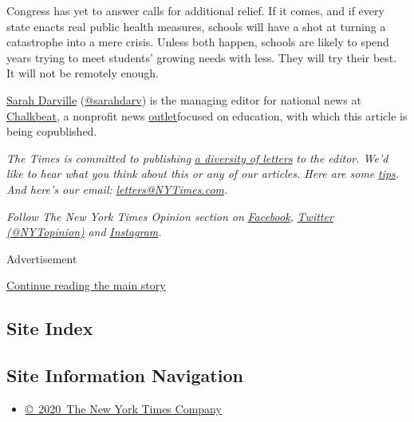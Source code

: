Congress has yet to answer calls for additional relief. If it comes, and
if every state enacts real public health measures, schools will have a
shot at turning a catastrophe into a mere crisis. Unless both happen,
schools are likely to spend years trying to meet students' growing needs
with less. They will try their best. It will not be remotely enough.

\href{https://www.chalkbeat.org/authors/sarah-darville}{Sarah Darville}
(\href{https://twitter.com/sarahdarv?lang=en}{@sarahdarv}) is the
managing editor for national news at
\href{https://www.chalkbeat.org/}{Chalkbeat}, a nonprofit news
\href{https://www.chalkbeat.org/pages/newsletters}{outlet}focused on
education, with which this article is being copublished.

\emph{The Times is committed to publishing}
\href{https://www.nytimes3xbfgragh.onion/2019/01/31/opinion/letters/letters-to-editor-new-york-times-women.html}{\emph{a
diversity of letters}} \emph{to the editor. We'd like to hear what you
think about this or any of our articles. Here are some}
\href{https://help.nytimes3xbfgragh.onion/hc/en-us/articles/115014925288-How-to-submit-a-letter-to-the-editor}{\emph{tips}}\emph{.
And here's our email:}
\href{mailto:letters@NYTimes.com}{\emph{letters@NYTimes.com}}\emph{.}

\emph{Follow The New York Times Opinion section on}
\href{https://www.facebookcorewwwi.onion/nytopinion}{\emph{Facebook}}\emph{,}
\href{http://twitter.com/NYTOpinion}{\emph{Twitter (@NYTopinion)}}
\emph{and}
\href{https://www.instagram.com/nytopinion/}{\emph{Instagram}}\emph{.}

Advertisement

\protect\hyperlink{after-bottom}{Continue reading the main story}

\hypertarget{site-index}{%
\subsection{Site Index}\label{site-index}}

\hypertarget{site-information-navigation}{%
\subsection{Site Information
Navigation}\label{site-information-navigation}}

\begin{itemize}
\tightlist
\item
  \href{https://help.nytimes3xbfgragh.onion/hc/en-us/articles/115014792127-Copyright-notice}{©~2020~The
  New York Times Company}
\end{itemize}

